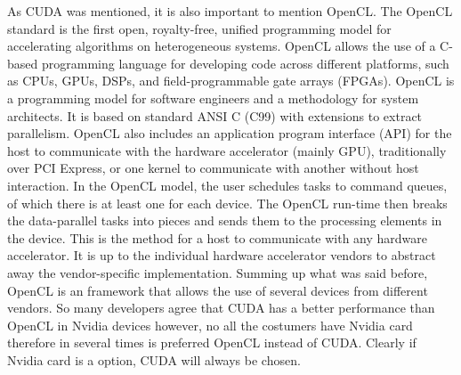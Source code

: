 \documentclass[Ingles]{ic-tese-v1}
\begin{document}
As CUDA was mentioned, it is also important to mention OpenCL. The OpenCL standard is the first open, royalty-free, unified programming model for accelerating algorithms on heterogeneous systems. OpenCL allows the use of a C-based programming language for developing code across different platforms, such as CPUs, GPUs, DSPs, and field-programmable gate arrays (FPGAs).
OpenCL is a programming model for software engineers and a methodology for system architects. It is based on standard ANSI C (C99) with extensions to extract parallelism. OpenCL also includes an application program interface (API) for the host to communicate with the hardware accelerator (mainly GPU), traditionally over PCI Express, or one kernel to communicate with another without host interaction.
In the OpenCL model, the user schedules tasks to command queues, of which there is at least one for each device. The OpenCL run-time then breaks the data-parallel tasks into pieces and sends them to the processing elements in the device. This is the method for a host to communicate with any hardware accelerator. It is up to the individual hardware accelerator vendors to abstract away the vendor-specific implementation. 
Summing up what was said before, OpenCL is an framework that allows the use of several devices from different vendors. So many developers agree that CUDA has a better performance than OpenCL in Nvidia devices however, no all the costumers have Nvidia card therefore in several times is preferred OpenCL instead of CUDA. Clearly if Nvidia card is a option, CUDA will always be chosen.
\end{document}
